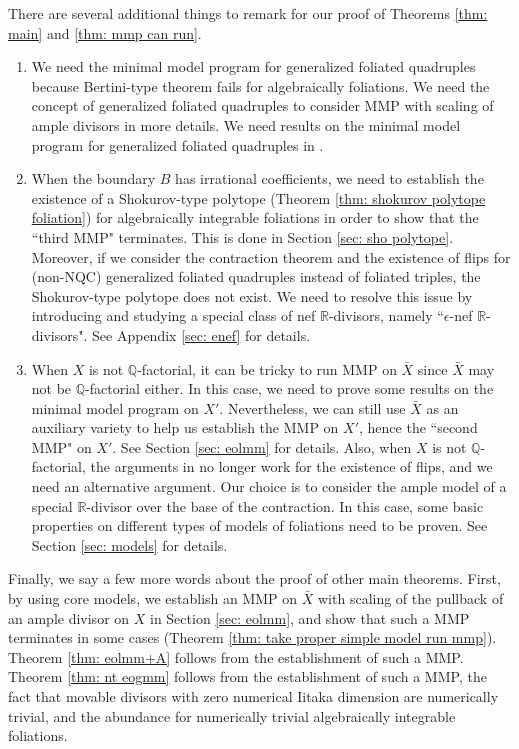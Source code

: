 \documentclass[11pt]{amsart}
\numberwithin{equation}{section}
\newcommand{\Qq}{\mathbb{Q}}
\newcommand{\Rr}{\mathbb{R}}
\theoremstyle{definition}
\theoremstyle{definition}
\theoremstyle{definition}
\begin{document}
There are several additional things to remark for our proof of Theorems \ref{thm: main} and \ref{thm: mmp can run}.
\begin{enumerate}
    \item We need the minimal model program for generalized foliated quadruples because Bertini-type theorem fails for algebraically foliations. We need the concept of generalized foliated quadruples to consider MMP with scaling of ample divisors in more details. We need results on the minimal model program for generalized foliated quadruples in \cite{CHLX23}.
    \item When the boundary $B$ has irrational coefficients, we need to establish the existence of a Shokurov-type polytope (Theorem \ref{thm: shokurov polytope foliation}) for algebraically integrable foliations in order to show that the ``third MMP" terminates. This is done in Section \ref{sec: sho polytope}. Moreover, if we consider the contraction theorem and the existence of flips for (non-NQC) generalized foliated quadruples instead of foliated triples, the Shokurov-type polytope does not exist. We need to resolve this issue by introducing and studying a special class of nef $\Rr$-divisors, namely ``$\epsilon$-nef $\Rr$-divisors". See Appendix \ref{sec: enef} for details.
    \item When $X$ is not $\Qq$-factorial, it can be tricky to run MMP on $\bar X$ since $\bar X$ may not be $\Qq$-factorial either. In this case, we need to prove some results on the minimal model program on $X'$. Nevertheless, we can still use $\bar X$ as an auxiliary variety to help us establish the MMP on $X'$, hence the ``second MMP" on $X'$. See Section \ref{sec: eolmm} for details. Also, when $X$ is not $\Qq$-factorial, the arguments in \cite{CS23a} no longer work for the existence of flips, and we need an alternative argument. Our choice is to consider the ample model of a special $\Rr$-divisor over the base of the contraction. In this case, some basic properties on different types of models of foliations need to be proven. See Section \ref{sec: models} for details.
\end{enumerate}

Finally, we say a few more words about the proof of other main theorems. First, by using core models, we establish an MMP on $\bar X$ with scaling of the pullback of an ample divisor on $X$ in Section \ref{sec: eolmm}, and show that such a MMP terminates in some cases (Theorem \ref{thm: take proper simple model run mmp}). Theorem \ref{thm: eolmm+A} follows from the establishment of such a MMP. Theorem \ref{thm: nt eogmm} follows from the establishment of such a MMP, the fact that movable divisors with zero numerical Iitaka dimension are numerically trivial, and the abundance for numerically trivial algebraically integrable foliations.
\end{document}

